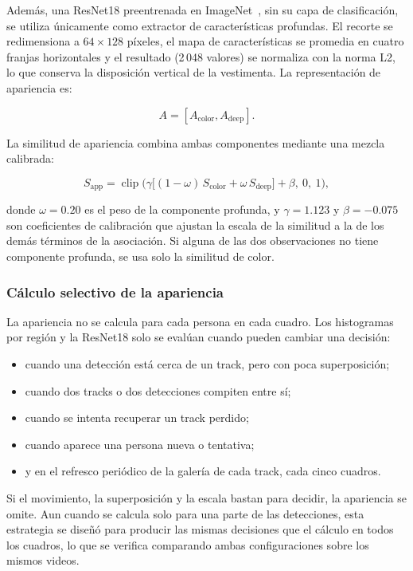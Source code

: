 \documentclass[12pt,a4paper]{article}
\begin{document}
Además, una ResNet18 preentrenada en ImageNet~\cite{deng2009}, sin su capa de
clasificación, se utiliza únicamente como extractor de características
profundas. El recorte se redimensiona a $64\times128$ píxeles, el mapa
de características se promedia en cuatro franjas horizontales y el
resultado (2\,048 valores) se normaliza con la norma L2, lo que conserva
la disposición vertical de la vestimenta. La representación de
apariencia es:

\begin{equation}
A=[A_{\text{color}},A_{\text{deep}}].
\end{equation}

La similitud de apariencia combina ambas componentes mediante una mezcla
calibrada:

\begin{equation}
S_{\text{app}}=
\operatorname{clip}\!\Big(
\gamma\big[(1-\omega)\,S_{\text{color}}+\omega\,S_{\text{deep}}\big]
+\beta,\ 0,\ 1
\Big),
\end{equation}

donde $\omega=0.20$ es el peso de la componente profunda, y $\gamma=1.123$
y $\beta=-0.075$ son coeficientes de calibración que ajustan la escala de
la similitud a la de los demás términos de la asociación. Si alguna de
las dos observaciones no tiene componente profunda, se usa solo la
similitud de color.

\subsubsection{Cálculo selectivo de la apariencia}

La apariencia no se calcula para cada persona en cada cuadro. Los
histogramas por región y la ResNet18 solo se evalúan cuando pueden
cambiar una decisión:

\begin{itemize}
    \item cuando una detección está cerca de un track, pero con poca
    superposición;
    \item cuando dos tracks o dos detecciones compiten entre sí;
    \item cuando se intenta recuperar un track perdido;
    \item cuando aparece una persona nueva o tentativa;
    \item y en el refresco periódico de la galería de cada track, cada
    cinco cuadros.
\end{itemize}

Si el movimiento, la superposición y la escala bastan para decidir, la
apariencia se omite. Aun cuando se calcula solo para una parte de las
detecciones, esta estrategia se diseñó para producir las mismas
decisiones que el cálculo en todos los cuadros, lo que se verifica
comparando ambas configuraciones sobre los mismos videos.
\end{document}
